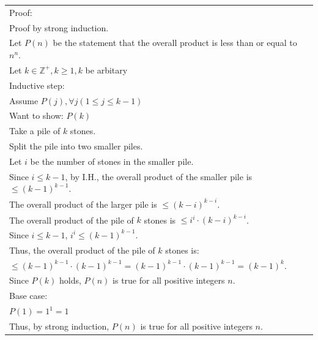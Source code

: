 \documentclass[12pt]{exam}
\begin{document}
\begin{solution}

	\begin{tabular}{ll}
		Proof:                                                                                   \\
		Proof by strong induction.                                                               \\
		Let $P(n)$ be the statement that the overall product is less than or equal to $n^n$.     \\
		Let $k\in \mathbb{Z}^+, k\ge 1, k$ be arbitary                                           \\
		Inductive step:                                                                          \\
		Assume $P(j), \forall j(1\le j\le k-1)$                                                  \\
		Want to show: $P(k)$                                                                     \\
		Take a pile of $k$ stones.                                                               \\
		Split the pile into two smaller piles.                                                   \\
		Let $i$ be the number of stones in the smaller pile.                                     \\
		Since $i\le k-1$, by I.H., the overall product of the smaller pile is $\le (k-1)^{k-1}$. \\
		The overall product of the larger pile is $\le (k-i)^{k-i}$.                             \\
		The overall product of the pile of $k$ stones is $\le i^{i}\cdot (k-i)^{k-i}$.           \\
		Since $i\le k-1$, $i^{i}\le (k-1)^{k-1}$.                                                \\
		Thus, the overall product of the pile of $k$ stones is:                                  \\
		$\le (k-1)^{k-1}\cdot (k-1)^{k-1}=(k-1)^{k-1}\cdot (k-1)^{k-1}=(k-1)^{k}$.               \\
		Since $P(k)$ holds, $P(n)$ is true for all positive integers $n$.                        \\
		Base case:                                                                               \\
		$P(1)=1^1=1$                                                                             \\
		Thus, by strong induction, $P(n)$ is true for all positive integers $n$.
	\end{tabular}
\end{solution}
\end{document}
